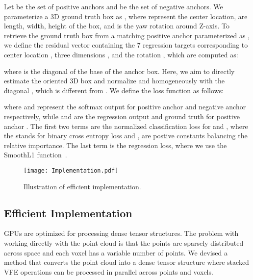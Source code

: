 \documentclass[10pt,twocolumn,letterpaper]{article}
\begin{document}
Let  be the set of  positive anchors and  be the set of  negative anchors. We parameterize a 3D ground truth box as , where  represent the center location,  are length, width, height of the box, and  is the yaw rotation around Z-axis. To retrieve the ground truth box from a matching positive anchor parameterized as , we define the residual vector   containing the 7 regression targets corresponding to center location , three dimensions , and the rotation , which are computed as:

where  is the diagonal of the base of the anchor box. Here, we aim to directly estimate the oriented 3D box and normalize  and  homogeneously with the diagonal , which is different from \cite{REF:NIPS2015_5638,REF:DeepSlidingShapes,REF:VeloFCN, REF:3DFCN,REF:nips15chen,REF:cvpr16chen,REF:cvpr17chen}. We define the loss function as follows:


where  and  represent the softmax output for positive anchor  and negative anchor  respectively, while  and  are the regression output and ground truth for positive anchor . The first two terms are the normalized classification loss for  and , where the  stands for binary cross entropy loss and ,  are postive constants balancing the relative importance. The last term  is the regression loss, where we use the SmoothL1 function~\cite{REF:Girshick:2015,REF:NIPS2015_5638}.




\begin{figure}[!t]
\centering
    \texttt{[image: Implementation.pdf]}
\caption{Illustration of efficient implementation.}
\vspace{-0.3cm}
\label{fig:Implementation}
\end{figure}


\subsection{Efficient Implementation}
\label{subsec:implementation}




GPUs are optimized for processing dense tensor structures. The problem with working directly with the point cloud is that the points are sparsely distributed across space and each voxel has a variable number of points.  We devised a method that converts the point cloud into a dense tensor structure where stacked VFE operations can be processed in parallel  across points and voxels. 
\end{document}
